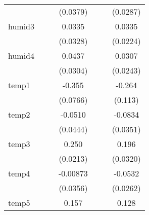 {\begin{tabular}{l*{6}{c}}
            &                     &                     &    (0.0379)         &                     &                     &    (0.0287)         \\
[1em]
humid3      &                     &                     &      0.0335         &                     &                     &      0.0335         \\
            &                     &                     &    (0.0328)         &                     &                     &    (0.0224)         \\
[1em]
humid4      &                     &                     &      0.0437         &                     &                     &      0.0307         \\
            &                     &                     &    (0.0304)         &                     &                     &    (0.0243)         \\
[1em]
temp1       &                     &                     &      -0.355\sym{***}&                     &                     &      -0.264\sym{*}  \\
            &                     &                     &    (0.0766)         &                     &                     &     (0.113)         \\
[1em]
temp2       &                     &                     &     -0.0510         &                     &                     &     -0.0834\sym{*}  \\
            &                     &                     &    (0.0444)         &                     &                     &    (0.0351)         \\
[1em]
temp3       &                     &                     &       0.250\sym{***}&                     &                     &       0.196\sym{***}\\
            &                     &                     &    (0.0213)         &                     &                     &    (0.0320)         \\
[1em]
temp4       &                     &                     &    -0.00873         &                     &                     &     -0.0532         \\
            &                     &                     &    (0.0356)         &                     &                     &    (0.0262)         \\
[1em]
temp5       &                     &                     &       0.157\sym{*}  &                     &                     &       0.128\sym{*}  \\

\end{tabular}}
